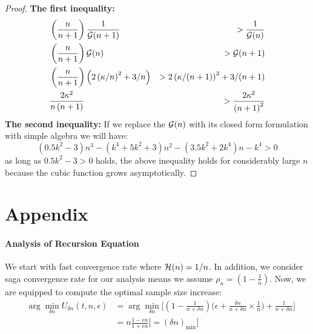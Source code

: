 \documentclass{article}
\newcommand{\bound}{{\cal H}}
\newcommand{\ERMbound}{{\cal G}}
\begin{document}
\begin{proof}
	\textbf{The first inequality:}
	\begin{eqnarray*}	
		& \left( \frac{n}{n+1}\right) \frac{1}{\ERMbound(n+1)}  & > 
	\frac{1}{\ERMbound(n)} \\ 
	   & \left( \frac{n}{n+1}\right)  \ERMbound(n) & > \ERMbound(n+1) \\
	   &  \left( \frac{n}{n+1}\right) \left(2\left( \kappa/n\right)^2 + 3/n
	   \right) & > 2\left( \kappa/(n+1)\right)^2 + 3/(n+1) \\ 
	   &  \frac{2 \kappa^2}{n\left(n+1\right)} & >  \frac{2
	   \kappa^2}{\left(n+1\right)^2}
	\end{eqnarray*}
	\textbf{The second inequality:}
	If we replace the $\ERMbound(n)$ with its closed form formulation with simple
	algebra we will have:
	\begin{equation*}
		(0.5 k^2-3) n^3 -(k^4 + 5 k^2 +3 ) n^2 -(3.5 k^2 +2 k^4) n -k^4 >0 
	\end{equation*}
	as long as $0.5 k^2 - 3 >0$ holds, the above inequality holds for considerably
	large $n$ because the cubic function grows asymptotically.
\end{proof}
\section{Appendix}
\paragraph{Analysis of Recursion Equation} 
We start with fast
convergence rate where $\bound(n) = 1/n$. In addition, we consider saga convergence rate for our
analysis means we assume $\rho_n = (1-\frac{1}{n})$. Now, we are equipped to
compute the optimal sample size increase: 
\begin{eqnarray*}
	& \arg \min_{\delta n} U_{\delta n}(t,n,\epsilon) & = \arg \min_{\delta
	n}\bigg[(1-\frac{1}{n+\delta n})\bigg(\epsilon + \frac{\delta n}{n+\delta n}
	\times \frac{1}{n}\bigg) + \frac{1}{n+\delta n}\bigg] \\
	& & = n \frac{1- \epsilon n}{1+\epsilon n } \bigg[= (\delta
	n)_{\min}\bigg]
\end{eqnarray*}
\end{document}
